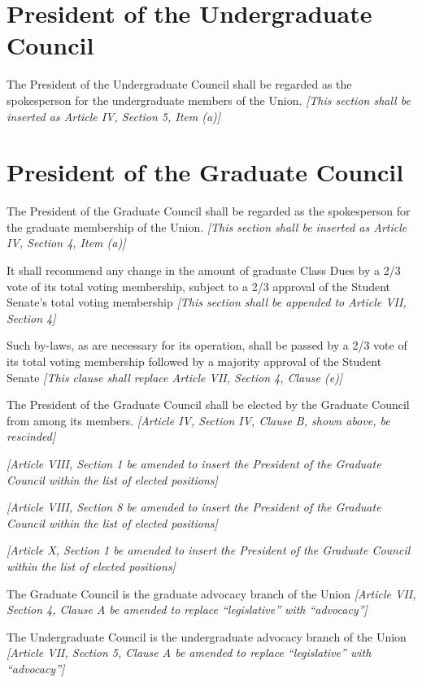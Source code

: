 \documentclass{uniondoc}
\begin{document}
\section{President of the Undergraduate Council}
The President of the Undergraduate Council shall be regarded as the spokesperson for the undergraduate members of the Union.
\textit{[This section shall be inserted as Article IV, Section 5, Item (a)]}

\section{President of the Graduate Council}
The President of the Graduate Council shall be regarded as the spokesperson for the graduate membership of the Union.
\textit{[This section shall be inserted as Article IV, Section 4, Item (a)]}

\amendment{}

It shall recommend any change in the amount of graduate Class Dues by a 2/3 vote of its total voting membership, subject to a 2/3 approval of the Student Senate's total voting membership
\textit{[This section shall be appended to Article VII, Section 4]}

Such by-laws, as are necessary for its operation, shall be passed by a 2/3 vote of its total voting membership followed by a majority approval of the Student Senate
\textit{[This clause shall replace Article VII, Section 4, Clause (e)]}

The President of the Graduate Council shall be elected by the Graduate Council from among its members.
\textit{[Article IV, Section IV, Clause B, shown above, be rescinded]}

\textit{[Article VIII, Section 1 be amended to insert the President of the Graduate Council within the list of elected positions]}

\textit{[Article VIII, Section 8 be amended to insert the President of the Graduate Council within the list of elected positions]}

\textit{[Article X, Section 1 be amended to insert the President of the Graduate Council within the list of elected positions]}

The Graduate Council is the graduate advocacy branch of the Union
\textit{[Article VII, Section 4, Clause A be amended to replace ``legislative'' with ``advocacy'']}

The Undergraduate Council is the undergraduate advocacy branch of the Union
\textit{[Article VII, Section 5, Clause A be amended to replace ``legislative'' with ``advocacy'']}
\end{document}
